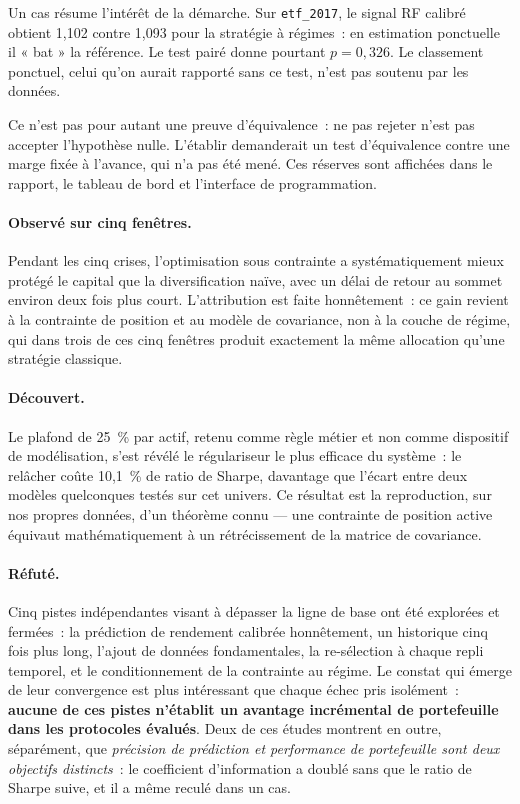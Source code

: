 Un cas résume l'intérêt de la démarche. Sur \texttt{etf\_2017}, le signal RF
calibré obtient 1,102 contre 1,093 pour la stratégie à régimes~: en estimation
ponctuelle il « bat » la référence. Le test pairé donne pourtant $p = 0{,}326$.
Le classement ponctuel, celui qu'on aurait rapporté sans ce test, n'est pas
soutenu par les données.

Ce n'est pas pour autant une preuve d'équivalence~: ne pas rejeter n'est pas
accepter l'hypothèse nulle. L'établir demanderait un test d'équivalence contre une
marge fixée à l'avance, qui n'a pas été mené. Ces réserves sont affichées dans le
rapport, le tableau de bord et l'interface de programmation.

\paragraph{Observé sur cinq fenêtres.} Pendant les cinq crises, l'optimisation sous
contrainte a systématiquement mieux protégé le capital que la diversification
naïve, avec un délai de retour au sommet environ deux fois plus court.
L'attribution est faite honnêtement~: ce gain revient à la contrainte de position
et au modèle de covariance, non à la couche de régime, qui dans trois de ces cinq
fenêtres produit exactement la même allocation qu'une stratégie classique.

\paragraph{Découvert.} Le plafond de 25~\% par actif, retenu comme règle métier et
non comme dispositif de modélisation, s'est révélé le régulariseur le plus
efficace du système~: le relâcher coûte 10,1~\% de ratio de Sharpe, davantage que
l'écart entre deux modèles quelconques testés sur cet univers. Ce résultat est la
reproduction, sur nos propres données, d'un théorème connu — une contrainte de
position active équivaut mathématiquement à un rétrécissement de la matrice de
covariance.

\paragraph{Réfuté.} Cinq pistes indépendantes visant à dépasser la ligne de base
ont été explorées et fermées~: la prédiction de rendement calibrée honnêtement,
un historique cinq fois plus long, l'ajout de données fondamentales, la
re-sélection à chaque repli temporel, et le conditionnement de la contrainte au
régime. Le constat qui émerge de leur convergence est plus intéressant que chaque
échec pris isolément~: \textbf{aucune de ces pistes n'établit un avantage
incrémental de portefeuille dans les protocoles évalués}. Deux de ces études
montrent en outre, séparément, que \emph{précision de prédiction et
performance de portefeuille sont deux objectifs distincts}~: le coefficient
d'information a doublé sans que le ratio de Sharpe suive, et il a même reculé
dans un cas.

